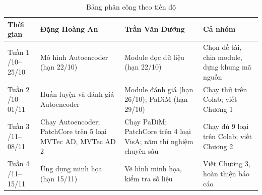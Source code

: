 \begin{table}[htbp]
  \centering
  \caption*{Bảng phân công theo tiến độ}
  \small
  \setlength{\tabcolsep}{4pt}
  \begin{tabular}{@{}>{\raggedright\arraybackslash}p{2.1cm} >{\raggedright\arraybackslash}p{4cm} >{\raggedright\arraybackslash}p{4cm} >{\raggedright\arraybackslash}p{4cm}@{}}
    \toprule
    Thời gian & Đặng Hoàng An & Trần Văn Dưỡng & Cả nhóm \\
    \midrule
    Tuần 1 \newline 19/10--25/10 & Mô hình Autoencoder (hạn 22/10) & Module đọc dữ liệu (hạn 22/10) & Chọn đề tài, chia
      module, dựng khung mã nguồn \\
    \addlinespace
    Tuần 2 \newline 26/10--01/11 & Huấn luyện và đánh giá Autoencoder & Module đánh giá (hạn 26/10); PaDiM (hạn
      29/10) & Chạy thử trên Colab; viết Chương 1 \\
    \addlinespace
    Tuần 3 \newline 02/11--08/11 & Chạy Autoencoder; PatchCore trên 5 loại MVTec AD, MVTec AD 2 & Chạy PaDiM; PatchCore trên 4 loại VisA; năm thí nghiệm chuyên sâu & Chạy đủ
      9 loại trên Colab; viết Chương 2 \\
    \addlinespace
    Tuần 4 \newline 09/11--15/11 & Ứng dụng minh họa (hạn 15/11) & Vẽ hình minh họa, kiểm tra số liệu & Viết Chương 3,
      hoàn thiện báo cáo \\
    \bottomrule
  \end{tabular}
\end{table}
